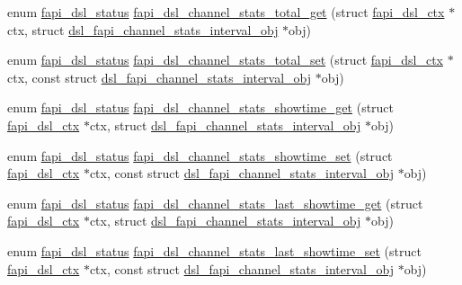 \begin{DoxyCompactItemize}
\item 
enum \hyperlink{group__FAPI__DSL_ga6a68d961535e6f7aa239751763131a70}{fapi\-\_\-dsl\-\_\-status} \hyperlink{group__FAPI__DSL_gae9f992ac21af5b5c53c24e49ffa0f278}{fapi\-\_\-dsl\-\_\-channel\-\_\-stats\-\_\-total\-\_\-get} (struct \hyperlink{structfapi__dsl__ctx}{fapi\-\_\-dsl\-\_\-ctx} $\ast$ctx, struct \hyperlink{structdsl__fapi__channel__stats__interval__obj}{dsl\-\_\-fapi\-\_\-channel\-\_\-stats\-\_\-interval\-\_\-obj} $\ast$obj)
\item 
enum \hyperlink{group__FAPI__DSL_ga6a68d961535e6f7aa239751763131a70}{fapi\-\_\-dsl\-\_\-status} \hyperlink{group__FAPI__DSL_gaa8989ed2cc50cd6031d2382f016745ca}{fapi\-\_\-dsl\-\_\-channel\-\_\-stats\-\_\-total\-\_\-set} (struct \hyperlink{structfapi__dsl__ctx}{fapi\-\_\-dsl\-\_\-ctx} $\ast$ctx, const struct \hyperlink{structdsl__fapi__channel__stats__interval__obj}{dsl\-\_\-fapi\-\_\-channel\-\_\-stats\-\_\-interval\-\_\-obj} $\ast$obj)
\item 
enum \hyperlink{group__FAPI__DSL_ga6a68d961535e6f7aa239751763131a70}{fapi\-\_\-dsl\-\_\-status} \hyperlink{group__FAPI__DSL_gaed59fd0e238164b60d08fd2fd5b72325}{fapi\-\_\-dsl\-\_\-channel\-\_\-stats\-\_\-showtime\-\_\-get} (struct \hyperlink{structfapi__dsl__ctx}{fapi\-\_\-dsl\-\_\-ctx} $\ast$ctx, struct \hyperlink{structdsl__fapi__channel__stats__interval__obj}{dsl\-\_\-fapi\-\_\-channel\-\_\-stats\-\_\-interval\-\_\-obj} $\ast$obj)
\item 
enum \hyperlink{group__FAPI__DSL_ga6a68d961535e6f7aa239751763131a70}{fapi\-\_\-dsl\-\_\-status} \hyperlink{group__FAPI__DSL_ga4d6bef3ba50c1235c988ab410c0c24ca}{fapi\-\_\-dsl\-\_\-channel\-\_\-stats\-\_\-showtime\-\_\-set} (struct \hyperlink{structfapi__dsl__ctx}{fapi\-\_\-dsl\-\_\-ctx} $\ast$ctx, const struct \hyperlink{structdsl__fapi__channel__stats__interval__obj}{dsl\-\_\-fapi\-\_\-channel\-\_\-stats\-\_\-interval\-\_\-obj} $\ast$obj)
\item 
enum \hyperlink{group__FAPI__DSL_ga6a68d961535e6f7aa239751763131a70}{fapi\-\_\-dsl\-\_\-status} \hyperlink{group__FAPI__DSL_gae6d0226b0a0f6628c4d2e1adb2b2213d}{fapi\-\_\-dsl\-\_\-channel\-\_\-stats\-\_\-last\-\_\-showtime\-\_\-get} (struct \hyperlink{structfapi__dsl__ctx}{fapi\-\_\-dsl\-\_\-ctx} $\ast$ctx, struct \hyperlink{structdsl__fapi__channel__stats__interval__obj}{dsl\-\_\-fapi\-\_\-channel\-\_\-stats\-\_\-interval\-\_\-obj} $\ast$obj)
\item 
enum \hyperlink{group__FAPI__DSL_ga6a68d961535e6f7aa239751763131a70}{fapi\-\_\-dsl\-\_\-status} \hyperlink{group__FAPI__DSL_gaebb4cacdd2171b543ef75bf1f94e5604}{fapi\-\_\-dsl\-\_\-channel\-\_\-stats\-\_\-last\-\_\-showtime\-\_\-set} (struct \hyperlink{structfapi__dsl__ctx}{fapi\-\_\-dsl\-\_\-ctx} $\ast$ctx, const struct \hyperlink{structdsl__fapi__channel__stats__interval__obj}{dsl\-\_\-fapi\-\_\-channel\-\_\-stats\-\_\-interval\-\_\-obj} $\ast$obj)

\end{DoxyCompactItemize}
